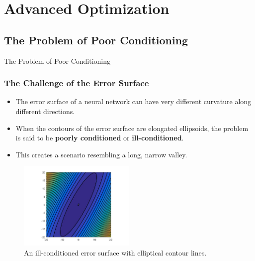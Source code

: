\section{Advanced Optimization}

\subsection{The Problem of Poor Conditioning}

\begin{frame}{The Problem of Poor Conditioning}
    \frametitle{The Challenge of the Error Surface}
    \begin{itemize}
        \item The error surface of a neural network can have very different curvature along different directions.
        \item When the contours of the error surface are elongated ellipsoids, the problem is said to be \textbf{poorly conditioned} or \textbf{ill-conditioned}.
        \item This creates a scenario resembling a long, narrow valley.
    \end{itemize}
    \begin{figure}
        \includegraphics[width=0.5\textwidth]{images/elongated_ellipsoid.jpeg}
        \caption{An ill-conditioned error surface with elliptical contour lines.}
    \end{figure}
\end{frame}

